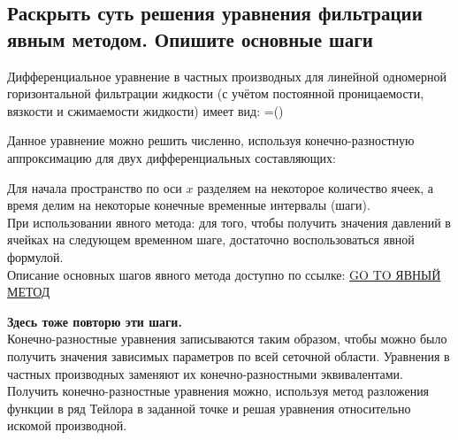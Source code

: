 

\subsection{Раскрыть суть решения уравнения фильтрации явным методом. Опишите основные шаги}

Дифференциальное уравнение в частных производных для линейной одномерной горизонтальной фильтрации жидкости (с учётом постоянной проницаемости, вязкости и сжимаемости жидкости) имеет вид:
\beq
{}=\left(\right)
\eeq

Данное уравнение можно решить численно, используя конечно-разностную аппроксимацию для двух дифференциальных составляющих:
\beq
{}
\eeq

Для начала пространство по оси $x$ разделяем на некоторое количество ячеек, а время делим на некоторые конечные временные интервалы (шаги).
\\

При использовании явного метода: для того, чтобы получить значения давлений в ячейках на следующем временном шаге, достаточно воспользоваться явной формулой.
\\


Описание основных шагов явного метода доступно по ссылке: \href{https://docs.yandex.ru/docs/view?url=ya-disk-public\%3A\%2F\%2FWicxck3PRHBvGgXBKaNry\%2FRtiluR1m6cR6Bi14xdyyNQDBM0D9VXsHr3EpLffWemDqZvSgIch5AN9ddz7ydViQ\%3D\%3D\%3A\%2F\%D0\%92\%D1\%82\%D0\%BE\%D1\%80\%D0\%BE\%D0\%B9\%20\%D0\%BA\%D1\%83\%D1\%80\%D1\%81\%20\%D0\%BC\%D0\%B0\%D0\%B3\%D0\%B8\%D1\%81\%D1\%82\%D1\%80\%D0\%B0\%D1\%82\%D1\%83\%D1\%80\%D1\%8B\%2F\%D0\%93\%D0\%B8\%D0\%B4\%D1\%80\%D0\%BE\%D0\%B4\%D0\%B8\%D0\%BD\%D0\%B0\%D0\%BC\%D0\%B8\%D1\%87\%D0\%B5\%D1\%81\%D0\%BA\%D0\%BE\%D0\%B5\%20\%D0\%BC\%D0\%BE\%D0\%B4\%D0\%B5\%D0\%BB\%D0\%B8\%D1\%80\%D0\%BE\%D0\%B2\%D0\%B0\%D0\%BD\%D0\%B8\%D0\%B5\%2FExplicit\%20Numerical\%20Solution\%20of\%20One-Dimensional\%20Filtration\%20in\%20a\%20Reservoir.pdf&name=Explicit\%20Numerical\%20Solution\%20of\%20One-Dimensional\%20Filtration\%20in\%20a\%20Reservoir.pdf&nosw=1}{GO TO ЯВНЫЙ МЕТОД}

\textbf{Здесь тоже повторю эти шаги.}
\\

Конечно-разностные уравнения записываются таким образом, чтобы можно было получить значения зависимых параметров по всей сеточной области.
Уравнения в частных производных заменяют их конечно-разностными эквивалентами.
Получить конечно-разностные уравнения можно, используя метод разложения функции в ряд Тейлора в заданной точке и решая уравнения относительно искомой производной.

